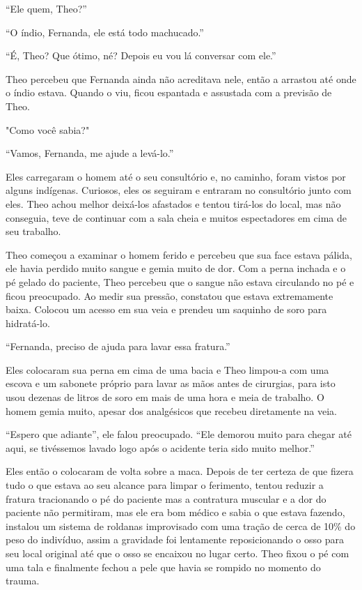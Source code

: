 ``Ele quem, Theo?''

``O índio, Fernanda, ele está todo machucado.''

``É, Theo? Que ótimo, né? Depois eu vou lá conversar com ele.''

Theo percebeu que Fernanda ainda não acreditava nele, então a arrastou
até onde o índio estava. Quando o viu, ficou espantada e assustada com a
previsão de Theo.

"Como você sabia?"

``Vamos, Fernanda, me ajude a levá-lo.''

Eles carregaram o homem até o seu consultório e, no caminho, foram
vistos por alguns indígenas. Curiosos, eles os seguiram e entraram no
consultório junto com eles. Theo achou melhor deixá-los afastados e
tentou tirá-los do local, mas não conseguia, teve de continuar com a
sala cheia e muitos espectadores em cima de seu trabalho.

Theo começou a examinar o homem ferido e percebeu que sua face estava
pálida, ele havia perdido muito sangue e gemia muito de dor. Com a perna
inchada e o pé gelado do paciente, Theo percebeu que o sangue não estava
circulando no pé e ficou preocupado. Ao medir sua pressão, constatou que
estava extremamente baixa. Colocou um acesso em sua veia e prendeu um
saquinho de soro para hidratá-lo.

``Fernanda, preciso de ajuda para lavar essa fratura.''

Eles colocaram sua perna em cima de uma bacia e Theo limpou-a com uma
escova e um sabonete próprio para lavar as mãos antes de cirurgias, para
isto usou dezenas de litros de soro em mais de uma hora e meia de
trabalho. O homem gemia muito, apesar dos analgésicos que recebeu
diretamente na veia.

``Espero que adiante'', ele falou preocupado. ``Ele demorou muito para
chegar até aqui, se tivéssemos lavado logo após o acidente teria sido
muito melhor.''

Eles então o colocaram de volta sobre a maca. Depois de ter certeza de
que fizera tudo o que estava ao seu alcance para limpar o ferimento,
tentou reduzir a fratura tracionando o pé do paciente mas a contratura
muscular e a dor do paciente não permitiram, mas ele era bom médico e
sabia o que estava fazendo, instalou um sistema de roldanas improvisado
com uma tração de cerca de 10\% do peso do indivíduo, assim a gravidade
foi lentamente reposicionando o osso para seu local original até que o
osso se encaixou no lugar certo. Theo fixou o pé com uma tala e
finalmente fechou a pele que havia se rompido no momento do trauma.

